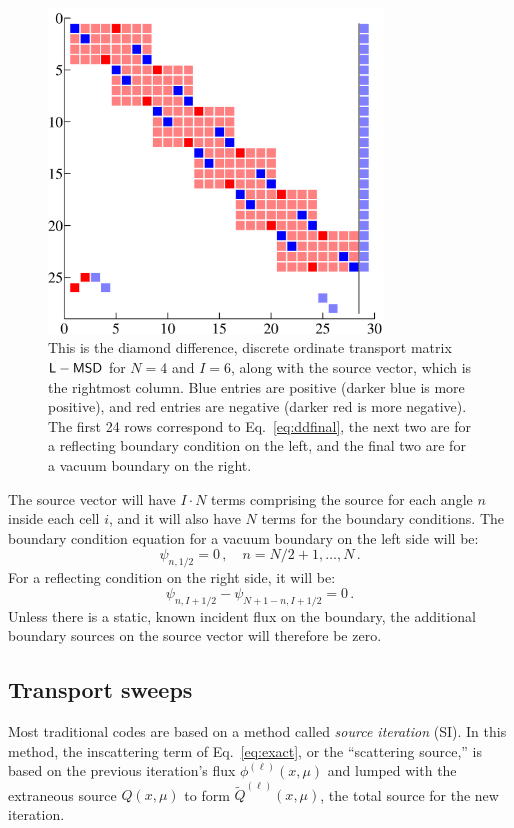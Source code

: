 \documentclass[]{SRJcommon}
\begin{document}
\begin{figure}[htb]
  \centering
  \includegraphics[width=3.5in]{matrix}
  \caption{This is the diamond difference, discrete ordinate transport matrix
  $\mathsf{L} - \mathsf{M} \mathsf{S} \mathsf{D}$
  for $N=4$ and $I=6$, along with the source vector, which is the rightmost
  column. Blue entries are positive (darker blue is more
  positive), and red entries are negative (darker red is more negative). The
  first 24 rows correspond to Eq.~\eqref{eq:ddfinal}, the next two are for a
  reflecting boundary condition on the left, and the final two are for a vacuum
  boundary on the right.}
  \label{fig:transportmatrix}
\end{figure}

The source vector will have $I\cdot N$ terms comprising the source for
each angle $n$ inside each cell $i$, and it will also have $N$ terms for the
boundary conditions.
The boundary condition equation for a vacuum boundary on the left side will be:
$$ \psi_{n,1/2} = 0 \,, \quad n= N/2 + 1, \ldots, N \,.$$
For a reflecting condition on the right side, it will be:
$$ \psi_{n,I+1/2} - \psi_{N+1-n,I+1/2} = 0 \,.$$
Unless there is a static, known incident flux on the boundary, the additional
boundary sources on the source vector will therefore be zero.
\subsection{Transport sweeps}
Most traditional codes are based on a method called \emph{source iteration}
(SI). In this method, the inscattering term of Eq.~\eqref{eq:exact},
or the ``scattering source,'' is based on the previous
iteration's flux $\phi^{(\ell)}(x,\mu)$ and lumped with the
extraneous source $Q(x,\mu)$ to form $\tilde{Q}^{(\ell)}(x,\mu)$, the total
source for the new iteration.
\end{document}
